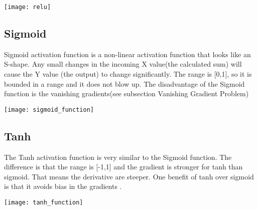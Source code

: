 \texttt{[image: relu]}

\subsection{Sigmoid}
Sigmoid activation function is a non-linear activation function that looks like an S-shape. Any small changes in the incoming X value(the calculated sum) will cause the Y value (the output) to change significantly. The range is [0,1], so it is bounded in a range and it does not blow up. The disadvantage of the Sigmoid function is the vanishing gradients(see subsection Vanishing Gradient Problem)

\texttt{[image: sigmoid\_function]}

\subsection{Tanh}
The Tanh activation function is very similar to the Sigmoid function. The difference is that the range is [-1,1] and the gradient is stronger for tanh than sigmoid. That means the derivative are steeper. One benefit of tanh over sigmoid is that it avoids bias in the gradients \cite{Tan_h}.

\texttt{[image: tanh\_function]}

